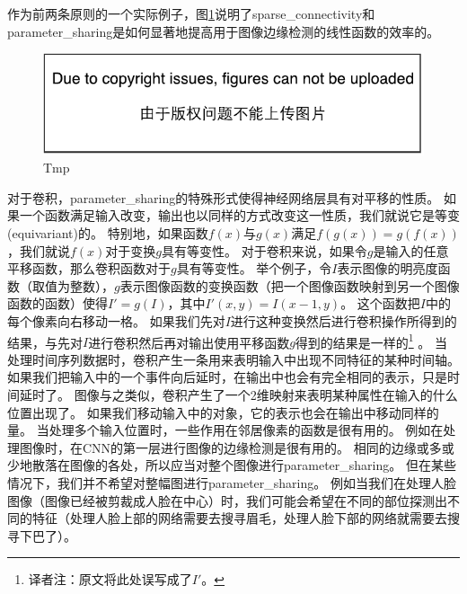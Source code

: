 作为前两条原则的一个实际例子，图\ref{fig:chap9_efficiency_of_edge_detection}说明了\gls{sparse_connectivity}和\gls{parameter_sharing}是如何显著地提高用于图像边缘检测的线性函数的效率的。
\begin{figure}
\ifOpenSource
\centerline{\includegraphics{figure.pdf}}
\else
\centering    
{}     
\fi
\caption{Tmp}     
\label{fig:chap9_efficiency_of_edge_detection}     
\end{figure}
 
对于卷积，\gls{parameter_sharing}的特殊形式使得神经网络层具有对平移的性质。
如果一个函数满足输入改变，输出也以同样的方式改变这一性质，我们就说它是等变(equivariant)的。
特别地，如果函数$f(x)$与$g(x)$满足$f(g(x))= g(f(x))$，我们就说$f(x)$对于变换$g$具有等变性。
对于卷积来说，如果令$g$是输入的任意平移函数，那么卷积函数对于$g$具有等变性。
举个例子，令$I$表示图像的明亮度函数（取值为整数），$g$表示图像函数的变换函数（把一个图像函数映射到另一个图像函数的函数）使得$I' = g(I)$，其中$I'(x,y) = I(x-1, y)$。
这个函数把$I$中的每个像素向右移动一格。
如果我们先对$I$进行这种变换然后进行卷积操作所得到的结果，与先对$I$进行卷积然后再对输出使用平移函数$g$得到的结果是一样的\footnote{译者注：原文将此处误写成了$I'$。} 。%
当处理时间序列数据时，卷积产生一条用来表明输入中出现不同特征的某种时间轴。
如果我们把输入中的一个事件向后延时，在输出中也会有完全相同的表示，只是时间延时了。
图像与之类似，卷积产生了一个2维映射来表明某种属性在输入的什么位置出现了。
如果我们移动输入中的对象，它的表示也会在输出中移动同样的量。
当处理多个输入位置时，一些作用在邻居像素的函数是很有用的。
例如在处理图像时，在\gls{CNN}的第一层进行图像的边缘检测是很有用的。
相同的边缘或多或少地散落在图像的各处，所以应当对整个图像进行\gls{parameter_sharing}。
但在某些情况下，我们并不希望对整幅图进行\gls{parameter_sharing}。
例如当我们在处理人脸图像（图像已经被剪裁成人脸在中心）时，我们可能会希望在不同的部位探测出不同的特征（处理人脸上部的网络需要去搜寻眉毛，处理人脸下部的网络就需要去搜寻下巴了）。

